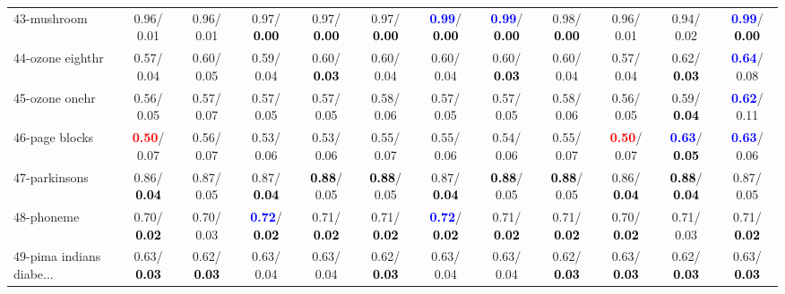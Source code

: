 \begin{table}[h]
\begin{center}
{\begin{tabular}{lc|c|c|c|c|c|c|c|c|c|c}
43-mushroom &   0.96/  0.01 &   0.96/  0.01 &   0.97/\textcolor{black}{\textbf{  0.00}} &   0.97/\textcolor{black}{\textbf{  0.00}} &   0.97/\textcolor{black}{\textbf{  0.00}} & \textcolor{blue}{\textbf{  0.99}}/\textcolor{black}{\textbf{  0.00}} & \textcolor{blue}{\textbf{  0.99}}/\textcolor{black}{\textbf{  0.00}} &   0.98/\textcolor{black}{\textbf{  0.00}} &   0.96/  0.01 &   0.94/  0.02 & \textcolor{blue}{\textbf{  0.99}}/\textcolor{black}{\textbf{  0.00}} \\
44-ozone eighthr &   0.57/  0.04 &   0.60/  0.05 &   0.59/  0.04 &   0.60/\textcolor{black}{\textbf{  0.03}} &   0.60/  0.04 &   0.60/  0.04 &   0.60/\textcolor{black}{\textbf{  0.03}} &   0.60/  0.04 &   0.57/  0.04 &   0.62/\textcolor{black}{\textbf{  0.03}} & \textcolor{blue}{\textbf{  0.64}}/  0.08 \\
45-ozone onehr &   0.56/  0.05 &   0.57/  0.07 &   0.57/  0.05 &   0.57/  0.05 &   0.58/  0.06 &   0.57/  0.05 &   0.57/  0.05 &   0.58/  0.06 &   0.56/  0.05 &   0.59/\textcolor{black}{\textbf{  0.04}} & \textcolor{blue}{\textbf{  0.62}}/  0.11 \\
46-page blocks & \textcolor{red}{\textbf{  0.50}}/  0.07 &   0.56/  0.07 &   0.53/  0.06 &   0.53/  0.06 &   0.55/  0.07 &   0.55/  0.06 &   0.54/  0.06 &   0.55/  0.07 & \textcolor{red}{\textbf{  0.50}}/  0.07 & \textcolor{blue}{\textbf{  0.63}}/\textcolor{black}{\textbf{  0.05}} & \textcolor{blue}{\textbf{  0.63}}/  0.06 \\ \hline
47-parkinsons &   0.86/\textcolor{black}{\textbf{  0.04}} &   0.87/  0.05 &   0.87/\textcolor{black}{\textbf{  0.04}} & \textcolor{black}{\textbf{  0.88}}/  0.05 & \textcolor{black}{\textbf{  0.88}}/  0.05 &   0.87/\textcolor{black}{\textbf{  0.04}} & \textcolor{black}{\textbf{  0.88}}/  0.05 & \textcolor{black}{\textbf{  0.88}}/  0.05 &   0.86/\textcolor{black}{\textbf{  0.04}} & \textcolor{black}{\textbf{  0.88}}/\textcolor{black}{\textbf{  0.04}} &   0.87/  0.05 \\
48-phoneme &   0.70/\textcolor{black}{\textbf{  0.02}} &   0.70/  0.03 & \textcolor{blue}{\textbf{  0.72}}/\textcolor{black}{\textbf{  0.02}} &   0.71/\textcolor{black}{\textbf{  0.02}} &   0.71/\textcolor{black}{\textbf{  0.02}} & \textcolor{blue}{\textbf{  0.72}}/\textcolor{black}{\textbf{  0.02}} &   0.71/\textcolor{black}{\textbf{  0.02}} &   0.71/\textcolor{black}{\textbf{  0.02}} &   0.70/\textcolor{black}{\textbf{  0.02}} &   0.71/  0.03 &   0.71/\textcolor{black}{\textbf{  0.02}} \\
49-pima indians diabe... &   0.63/\textcolor{black}{\textbf{  0.03}} &   0.62/\textcolor{black}{\textbf{  0.03}} &   0.63/  0.04 &   0.63/  0.04 &   0.62/\textcolor{black}{\textbf{  0.03}} &   0.63/  0.04 &   0.63/  0.04 &   0.62/\textcolor{black}{\textbf{  0.03}} &   0.63/\textcolor{black}{\textbf{  0.03}} &   0.62/\textcolor{black}{\textbf{  0.03}} &   0.63/\textcolor{black}{\textbf{  0.03}} \\

\end{tabular}}
\end{center}
\end{table}
